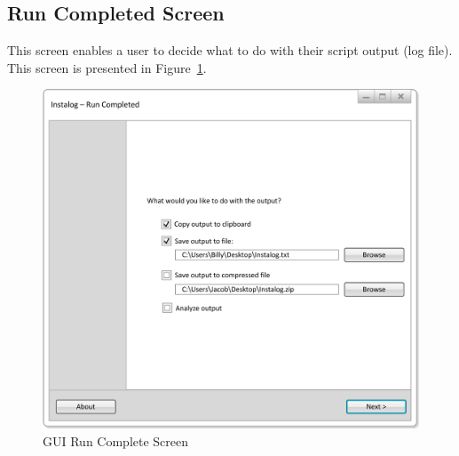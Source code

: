 \subsection{Run Completed Screen} \label{sec:run_completed_screen}
This screen enables a user to decide what to do with their script output (log
file).  This screen is presented in Figure~\ref{fig:gui_run_complete}.

\begin{figure}[h]
  	\centering
	\includegraphics{figures/gui/Run_Completed.png}
  	\caption{GUI Run Complete Screen}
  	\label{fig:gui_run_complete}
\end{figure}

